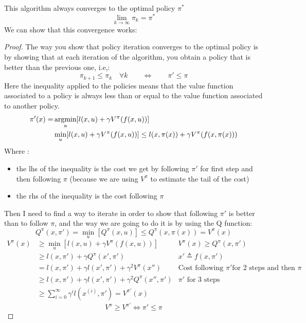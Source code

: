 This algorithm always converges to the optimal policy $\pi^*$
\[\lim_{k\to \infty} \pi_k = \pi^*\]
We can show that this convergence works:
\begin{proof}
The way you show that policy iteration converges to the optimal policy is by showing that at each iteration of the algorithm, you obtain a policy that is better than the previous one, i.e,:
\[\pi_{k+1}\le\pi_k\quad \forall k \qquad \iff \qquad \pi' \le \pi\]
Here the inequality applied to the policies means that the value function associated to a policy is always less than or equal to the value function associated to another policy.
\begin{align*}
\pi'(x) =&\operatorname*{argmin}_u [l(x,u) + \gamma V^{\pi}(f(x,u))]\\
& \min_u [l(x,u) + \gamma V^{\pi}(f(x,u))]\le l(x,\pi(x)) + \gamma V^{\pi}(f(x,\pi(x)))\\
\end{align*}
Where :
\begin{itemize}
\item the lhs of the inequality is the cost we get by following $\pi'$ for first step and then following $\pi$ (because we are using $V^{\pi}$ to estimate the tail of the cost)
\item the rhs of the inequality is the cost following $\pi$ 
\end{itemize}
Then  I need to find a way to iterate in order to show that following $\pi'$ is better than to follow $\pi$, and the way we are going to do it is by using the Q function:
\[Q^{\pi}(x,\pi') = \min_{u} [Q^{\pi}(x,u)]\le Q^{\pi}(x,\pi(x)) = V^{\pi}(x)\]
\begin{align*}
V^{\pi}(x) &\ge \min_u [l(x,u)+\gamma V^{\pi}(f(x,u))]&V^{\pi}(x) \ge Q^{\pi}(x,\pi')\\
&\ge l(x,\pi') + \gamma Q^{\pi}(x', \pi')&x'\triangleq f(x,\pi')\\
&= l(x,\pi') + \gamma l(x',\pi') + \gamma^2 V^{\pi}(x'')&\text{Cost following }\pi'\text{for 2 steps and then }\pi\\
&\ge l(x,\pi') + \gamma l(x', \pi') + \gamma^2 Q^{\pi}(x'', \pi')&\pi' \text{ for 3 steps}\\
&\ge \sum_{i=0}^{\infty} \gamma^i l(x^{(i)}, \pi') = V^{\pi'}(x)&
\end{align*}
\[V^{\pi} \ge V^{\pi'} \iff \pi'\le \pi\]
\end{proof}

